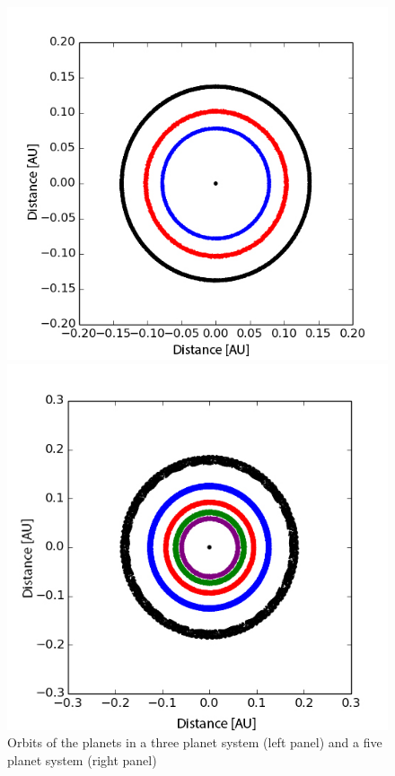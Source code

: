 \documentclass[12pt]{report}
\begin{document}
\begin{figure}
\centering
\begin{minipage}{.5\textwidth}
  \centering
  \includegraphics[width=1\linewidth]{img/180.jpg}
 

\end{minipage}%
\begin{minipage}{.5\textwidth}
  \centering
  \includegraphics[width=1\linewidth]{img/320.jpg}
  

\end{minipage}
\caption{Orbits of the planets in a three planet system (left panel) and a five planet system (right panel)}
\label{fig:stability_sim}
\end{figure}
\end{document}
